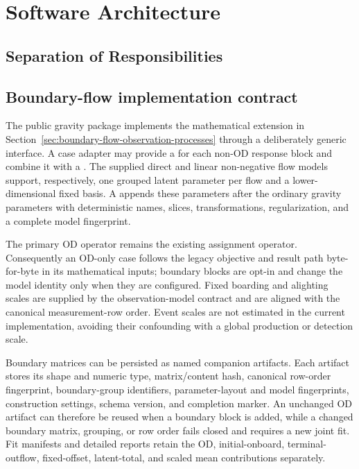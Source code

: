 
\section{Software Architecture}
\subsection{Separation of Responsibilities}






\subsection{Boundary-flow implementation contract}

The public gravity package implements the mathematical extension in
Section~\ref{sec:boundary-flow-observation-processes} through a deliberately
generic interface.  A case adapter may provide a
 for each non-OD response block and
combine it with a .  The supplied direct and
linear non-negative flow models support, respectively, one grouped latent
parameter per flow and a lower-dimensional fixed basis.  A
 appends these parameters after the
ordinary gravity parameters with deterministic names, slices, transformations,
regularization, and a complete model fingerprint.

The primary OD operator remains the existing assignment operator.  Consequently
an OD-only case follows the legacy objective and result path byte-for-byte in
its mathematical inputs; boundary blocks are opt-in and change the model
identity only when they are configured.  Fixed boarding and alighting scales
are supplied by the observation-model contract and are aligned with the
canonical measurement-row order.  Event scales are not estimated in the
current implementation, avoiding their confounding with a global production
or detection scale.

Boundary matrices can be persisted as named companion artifacts.  Each artifact
stores its shape and numeric type, matrix/content hash, canonical row-order
fingerprint, boundary-group identifiers, parameter-layout and model
fingerprints, construction settings, schema version, and completion marker.
An unchanged OD artifact can therefore be reused when a boundary block is
added, while a changed boundary matrix, grouping, or row order fails closed
and requires a new joint fit.  Fit manifests and detailed reports retain the
OD, initial-onboard, terminal-outflow, fixed-offset, latent-total, and scaled
mean contributions separately.

